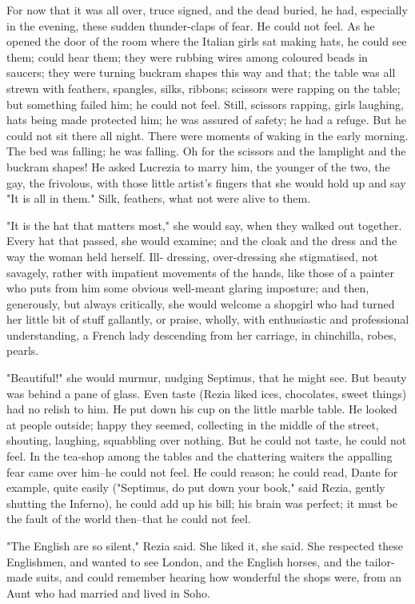 \documentclass[lang=cn,10pt]{elegantbook}
\begin{document}
For now that it was all over, truce signed, and the dead buried, he
had, especially in the evening, these sudden thunder-claps of fear.
He could not feel.  As he opened the door of the room where the
Italian girls sat making hats, he could see them; could hear them;
they were rubbing wires among coloured beads in saucers; they were
turning buckram shapes this way and that; the table was all strewn
with feathers, spangles, silks, ribbons; scissors were rapping on
the table; but something failed him; he could not feel.  Still,
scissors rapping, girls laughing, hats being made protected him; he
was assured of safety; he had a refuge.  But he could not sit there
all night.  There were moments of waking in the early morning.  The
bed was falling; he was falling.  Oh for the scissors and the
lamplight and the buckram shapes!  He asked Lucrezia to marry him,
the younger of the two, the gay, the frivolous, with those little
artist's fingers that she would hold up and say "It is all in
them."  Silk, feathers, what not were alive to them.

"It is the hat that matters most," she would say, when they walked
out together.  Every hat that passed, she would examine; and the
cloak and the dress and the way the woman held herself.  Ill-
dressing, over-dressing she stigmatised, not savagely, rather with
impatient movements of the hands, like those of a painter who puts
from him some obvious well-meant glaring imposture; and then,
generously, but always critically, she would welcome a shopgirl who
had turned her little bit of stuff gallantly, or praise, wholly,
with enthusiastic and professional understanding, a French lady
descending from her carriage, in chinchilla, robes, pearls.

"Beautiful!" she would murmur, nudging Septimus, that he might see.
But beauty was behind a pane of glass.  Even taste (Rezia liked
ices, chocolates, sweet things) had no relish to him.  He put down
his cup on the little marble table.  He looked at people outside;
happy they seemed, collecting in the middle of the street,
shouting, laughing, squabbling over nothing.  But he could not
taste, he could not feel.  In the tea-shop among the tables and the
chattering waiters the appalling fear came over him--he could not
feel.  He could reason; he could read, Dante for example, quite
easily ("Septimus, do put down your book," said Rezia, gently
shutting the Inferno), he could add up his bill; his brain was
perfect; it must be the fault of the world then--that he could not
feel.

"The English are so silent," Rezia said.  She liked it, she said.
She respected these Englishmen, and wanted to see London, and the
English horses, and the tailor-made suits, and could remember
hearing how wonderful the shops were, from an Aunt who had married
and lived in Soho.
\end{document}
